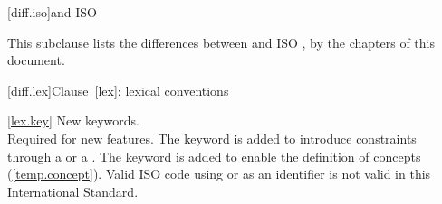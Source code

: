 
[diff.iso]{\Cpp and ISO }

\pnum
This subclause lists the differences between \Cpp
and ISO , by the chapters of this document.

[diff.lex]{Clause~\ref{lex}: lexical conventions}

\ref{lex.key}
\change New keywords.\\
\rationale Required for new features.
The  keyword is added
to introduce constraints through a  or
a . The  keyword is
added to enable the definition of concepts (\ref{temp.concept}).
\effect
Valid ISO  code using  or 
as an identifier is not valid in this International Standard.
